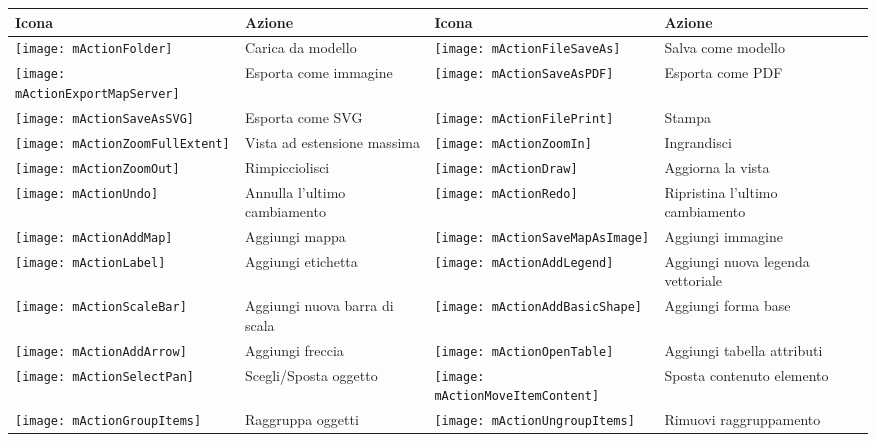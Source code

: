 \begin{table}[h]
\centering\small
\renewcommand{\arraystretch}{2}
 \begin{tabular}{|m{1cm}|m{5.4cm}|m{1cm}|m{5.4cm}|}
 \hline \textbf{Icona} & \textbf{Azione} & \textbf{Icona} &
 \textbf{Azione} \\
 \hline \texttt{[image: mActionFolder]}
 & Carica da modello &
 \texttt{[image: mActionFileSaveAs]} & Salva come modello \\
\hline \texttt{[image: mActionExportMapServer]}
 & Esporta come immagine &
 \texttt{[image: mActionSaveAsPDF]} & Esporta come PDF \\
 \hline \texttt{[image: mActionSaveAsSVG]} & Esporta come SVG & \texttt{[image: mActionFilePrint]}
 & Stampa \\
 \hline \texttt{[image: mActionZoomFullExtent]} & Vista ad estensione massima & \texttt{[image: mActionZoomIn]} & Ingrandisci \\
 \hline \texttt{[image: mActionZoomOut]} & Rimpicciolisci &
 \texttt{[image: mActionDraw]} & Aggiorna la vista \\
 \hline \texttt{[image: mActionUndo]} & Annulla l'ultimo cambiamento & \texttt{[image: mActionRedo]}
 & Ripristina l'ultimo cambiamento \\
 \hline \texttt{[image: mActionAddMap]} & Aggiungi mappa & \texttt{[image: mActionSaveMapAsImage]}
 & Aggiungi immagine \\
  \hline \texttt{[image: mActionLabel]} & Aggiungi etichetta & \texttt{[image: mActionAddLegend]} & 
 Aggiungi nuova legenda vettoriale \\
 \hline \texttt{[image: mActionScaleBar]} & Aggiungi nuova barra di scala
 & \texttt{[image: mActionAddBasicShape]}
 & Aggiungi forma base \\
 \hline \texttt{[image: mActionAddArrow]} & Aggiungi freccia
 & \texttt{[image: mActionOpenTable]} & Aggiungi tabella attributi \\
 \hline \texttt{[image: mActionSelectPan]} & Scegli/Sposta oggetto &
 \texttt{[image: mActionMoveItemContent]} & Sposta contenuto elemento \\
 \hline \texttt{[image: mActionGroupItems]} & Raggruppa oggetti &
 \texttt{[image: mActionUngroupItems]} & Rimuovi raggruppamento \\

\end{tabular}
\end{table}

